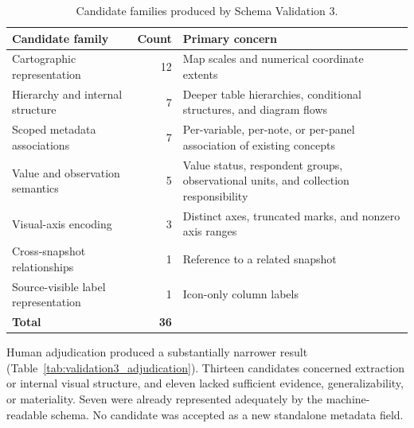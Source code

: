 \documentclass{article}
\begin{document}
\begin{table}[H]
    \centering
    \caption{Candidate families produced by Schema Validation 3.}
    \label{tab:validation3_candidate_families}
    \renewcommand{\arraystretch}{1.1}
    \small
    \begin{tabularx}{\textwidth}{>{\RaggedRight\arraybackslash}X r >{\RaggedRight\arraybackslash}p{}}
        \toprule
        \textbf{Candidate family} & \textbf{Count} & \textbf{Primary concern} \\
        \midrule
        Cartographic representation & 12 & Map scales and numerical coordinate extents \\
        Hierarchy and internal structure & 7 & Deeper table hierarchies, conditional structures, and diagram flows \\
        Scoped metadata associations & 7 & Per-variable, per-note, or per-panel association of existing concepts \\
        Value and observation semantics & 5 & Value status, respondent groups, observational units, and collection responsibility \\
        Visual-axis encoding & 3 & Distinct axes, truncated marks, and nonzero axis ranges \\
        Cross-snapshot relationships & 1 & Reference to a related snapshot \\
        Source-visible label representation & 1 & Icon-only column labels \\
        \midrule
        \textbf{Total} & \textbf{36} & \\
        \bottomrule
    \end{tabularx}
\end{table}

Human adjudication produced a substantially narrower result (Table~\ref{tab:validation3_adjudication}). Thirteen candidates concerned extraction or internal visual structure, and eleven lacked sufficient evidence, generalizability, or materiality. Seven were already represented adequately by the machine-readable schema. No candidate was accepted as a new standalone metadata field.
\end{document}
